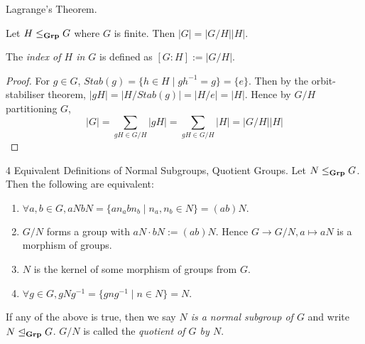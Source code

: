 \documentclass[../../book.tex]{subfiles}
\begin{document}
\begin{cor} Lagrange's Theorem. 

    Let $H \leq_{\mathbf{Grp}} G$ where $G$ is finite. 
    Then $|G| = |G / H||H|.$
    
    The \emph{index of $H$ in $G$} is defined as $[G : H] := |G / H|$. 
\end{cor}
\begin{proof}
    For $g \in G$, $Stab(g) = \{h \in H \mid gh^{-1} = g\} = \{e\}$.
    Then by the orbit-stabiliser theorem, $|gH| = |H/Stab(g)| = |H/{e}| = |H|$.
    Hence by $G / H$ partitioning $G$, 
    \[
        |G| = \sum_{gH \in G/H} |gH| = \sum_{gH \in G/H} |H| = |G/H| |H|
    \]
\end{proof}
\begin{dfn} 4 Equivalent Definitions of Normal Subgroups, 
Quotient Groups. 
    Let $N \leq_{\mathbf{Grp}} G$. 
    Then the following are equivalent: 
    \begin{enumerate}
        \item $\forall a, b \in G, aNbN = 
        \{an_abn_b \mid n_a, n_b \in N\} = (ab)N.$
        \item $G / N$ forms a group with $aN \cdot bN := (ab)N$.
            Hence $G \to G/N, a \mapsto aN$ is a morphism of groups.
        \item $N$ is the kernel of some morphism of groups from $G$. 
        \item $\forall g \in G, gNg^{-1} = \{gng^{-1} \mid n \in N\} = N$. 
    \end{enumerate}
    If any of the above is true, 
    then we say \emph{$N$ is a normal subgroup of $G$}
    and write $N \trianglelefteq_{\mathbf{Grp}} G$. 
    $G/N$ is called the \emph{quotient of $G$ by $N$}. 
\end{dfn}
\end{document}

